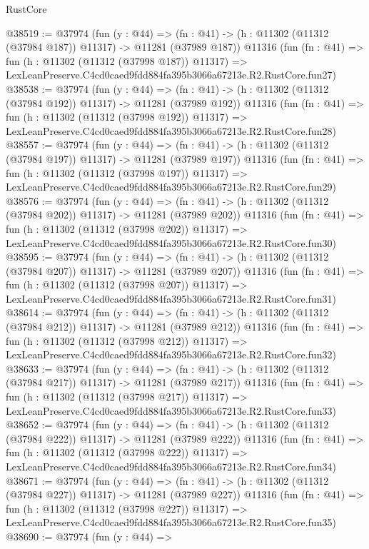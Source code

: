 \begin{lexlean}{RustCore}
\begin{coremodule}
@38519 := @37974
    (fun (y : @44) =>
    (fn : @41) -> (h : @11302 (@11312 (@37984 @187)) @11317) -> @11281 (@37989 @187))
    @11316
    (fun (fn : @41) =>
    fun (h : @11302 (@11312 (@37998 @187)) @11317) =>
    LexLeanPreserve.C4cd0caed9fdd884fa395b3066a67213e.R2.RustCore.fun27)
@38538 := @37974
    (fun (y : @44) =>
    (fn : @41) -> (h : @11302 (@11312 (@37984 @192)) @11317) -> @11281 (@37989 @192))
    @11316
    (fun (fn : @41) =>
    fun (h : @11302 (@11312 (@37998 @192)) @11317) =>
    LexLeanPreserve.C4cd0caed9fdd884fa395b3066a67213e.R2.RustCore.fun28)
@38557 := @37974
    (fun (y : @44) =>
    (fn : @41) -> (h : @11302 (@11312 (@37984 @197)) @11317) -> @11281 (@37989 @197))
    @11316
    (fun (fn : @41) =>
    fun (h : @11302 (@11312 (@37998 @197)) @11317) =>
    LexLeanPreserve.C4cd0caed9fdd884fa395b3066a67213e.R2.RustCore.fun29)
@38576 := @37974
    (fun (y : @44) =>
    (fn : @41) -> (h : @11302 (@11312 (@37984 @202)) @11317) -> @11281 (@37989 @202))
    @11316
    (fun (fn : @41) =>
    fun (h : @11302 (@11312 (@37998 @202)) @11317) =>
    LexLeanPreserve.C4cd0caed9fdd884fa395b3066a67213e.R2.RustCore.fun30)
@38595 := @37974
    (fun (y : @44) =>
    (fn : @41) -> (h : @11302 (@11312 (@37984 @207)) @11317) -> @11281 (@37989 @207))
    @11316
    (fun (fn : @41) =>
    fun (h : @11302 (@11312 (@37998 @207)) @11317) =>
    LexLeanPreserve.C4cd0caed9fdd884fa395b3066a67213e.R2.RustCore.fun31)
@38614 := @37974
    (fun (y : @44) =>
    (fn : @41) -> (h : @11302 (@11312 (@37984 @212)) @11317) -> @11281 (@37989 @212))
    @11316
    (fun (fn : @41) =>
    fun (h : @11302 (@11312 (@37998 @212)) @11317) =>
    LexLeanPreserve.C4cd0caed9fdd884fa395b3066a67213e.R2.RustCore.fun32)
@38633 := @37974
    (fun (y : @44) =>
    (fn : @41) -> (h : @11302 (@11312 (@37984 @217)) @11317) -> @11281 (@37989 @217))
    @11316
    (fun (fn : @41) =>
    fun (h : @11302 (@11312 (@37998 @217)) @11317) =>
    LexLeanPreserve.C4cd0caed9fdd884fa395b3066a67213e.R2.RustCore.fun33)
@38652 := @37974
    (fun (y : @44) =>
    (fn : @41) -> (h : @11302 (@11312 (@37984 @222)) @11317) -> @11281 (@37989 @222))
    @11316
    (fun (fn : @41) =>
    fun (h : @11302 (@11312 (@37998 @222)) @11317) =>
    LexLeanPreserve.C4cd0caed9fdd884fa395b3066a67213e.R2.RustCore.fun34)
@38671 := @37974
    (fun (y : @44) =>
    (fn : @41) -> (h : @11302 (@11312 (@37984 @227)) @11317) -> @11281 (@37989 @227))
    @11316
    (fun (fn : @41) =>
    fun (h : @11302 (@11312 (@37998 @227)) @11317) =>
    LexLeanPreserve.C4cd0caed9fdd884fa395b3066a67213e.R2.RustCore.fun35)
@38690 := @37974
    (fun (y : @44) =>

\end{coremodule}
\end{lexlean}
